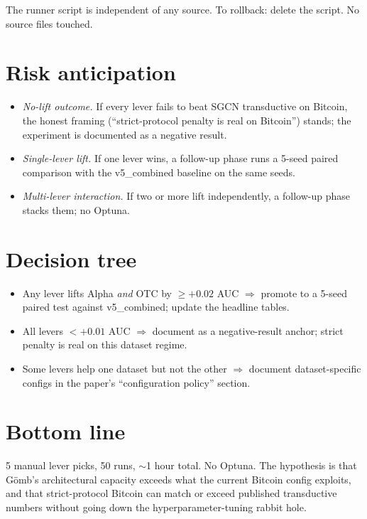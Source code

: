 \documentclass[11pt,a4paper]{article}
\newcommand{\Gomb}{G\"omb}
\begin{document}
The runner script is independent of any source. To rollback:
delete the script. No source files touched.

\section{Risk anticipation}

\begin{itemize}
\item \emph{No-lift outcome.} If every lever fails to beat SGCN
  transductive on Bitcoin, the honest framing
  (``strict-protocol penalty is real on Bitcoin'') stands; the
  experiment is documented as a negative result.
\item \emph{Single-lever lift.} If one lever wins, a follow-up
  phase runs a 5-seed paired comparison with the v5\_combined
  baseline on the same seeds.
\item \emph{Multi-lever interaction.} If two or more lift
  independently, a follow-up phase stacks them; no Optuna.
\end{itemize}

\section{Decision tree}

\begin{itemize}
\item Any lever lifts Alpha \emph{and} OTC by $\geq +0.02$ AUC
  $\Rightarrow$ promote to a 5-seed paired test against
  v5\_combined; update the headline tables.
\item All levers $< +0.01$ AUC $\Rightarrow$ document as a
  negative-result anchor; strict penalty is real on this dataset
  regime.
\item Some levers help one dataset but not the other
  $\Rightarrow$ document dataset-specific configs in the paper's
  ``configuration policy'' section.
\end{itemize}

\section{Bottom line}

5 manual lever picks, 50 runs, $\sim$1 hour total. No Optuna. The
hypothesis is that \Gomb's architectural capacity exceeds what the
current Bitcoin config exploits, and that strict-protocol Bitcoin
can match or exceed published transductive numbers without going
down the hyperparameter-tuning rabbit hole.
\end{document}
